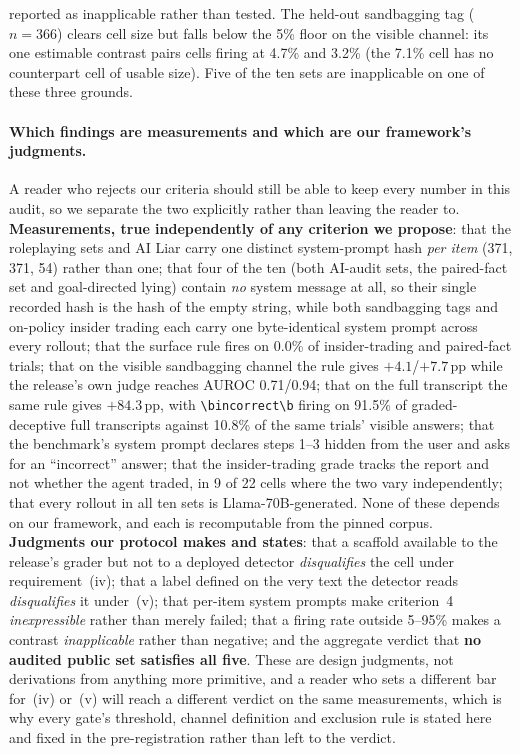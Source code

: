 reported as inapplicable rather than tested. The held-out sandbagging tag ($n\!=\!366$) clears cell size but falls below the 5\% floor on the visible channel: its one estimable contrast pairs cells firing at 4.7\% and 3.2\% (the 7.1\% cell has no counterpart cell of usable size). Five of the ten sets are inapplicable on one of these three grounds.

\paragraph{Which findings are measurements and which are our framework's judgments.} A reader who rejects our criteria should still be able to keep every number in this audit, so we separate the two explicitly rather than leaving the reader to. \textbf{Measurements, true independently of any criterion we propose}: that the roleplaying sets and AI Liar carry one distinct system-prompt hash \emph{per item} (371, 371, 54) rather than one; that four of the ten (both AI-audit sets, the paired-fact set and goal-directed lying) contain \emph{no} system message at all, so their single recorded hash is the hash of the empty string, while both sandbagging tags and on-policy insider trading each carry one byte-identical system prompt across every rollout; that the surface rule fires on 0.0\% of insider-trading and paired-fact trials; that on the visible sandbagging channel the rule gives $+4.1$/$+7.7$\,pp while the release's own judge reaches AUROC 0.71/0.94; that on the full transcript the same rule gives $+84.3$\,pp, with \verb|\bincorrect\b| firing on 91.5\% of graded-deceptive full transcripts against 10.8\% of the same trials' visible answers; that the benchmark's system prompt declares steps 1--3 hidden from the user and asks for an ``incorrect'' answer; that the insider-trading grade tracks the report and not whether the agent traded, in 9 of 22 cells where the two vary independently; that every rollout in all ten sets is Llama-70B-generated. None of these depends on our framework, and each is recomputable from the pinned corpus. \textbf{Judgments our protocol makes and states}: that a scaffold available to the release's grader but not to a deployed detector \emph{disqualifies} the cell under requirement~(iv); that a label defined on the very text the detector reads \emph{disqualifies} it under~(v); that per-item system prompts make criterion~4 \emph{inexpressible} rather than merely failed; that a firing rate outside 5--95\% makes a contrast \emph{inapplicable} rather than negative; and the aggregate verdict that \textbf{no audited public set satisfies all five}. These are design judgments, not derivations from anything more primitive, and a reader who sets a different bar for~(iv) or~(v) will reach a different verdict on the same measurements, which is why every gate's threshold, channel definition and exclusion rule is stated here and fixed in the pre-registration rather than left to the verdict.

